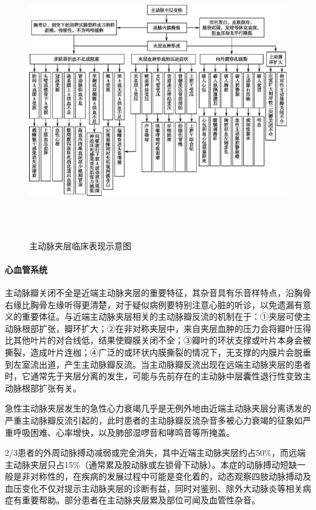 \begin{figure}[!htbp]
 \centering
 \includegraphics[width=6.32292in,height=4.6875in]{./images/Image00485.jpg}
 \captionsetup{justification=centering}
 \caption{主动脉夹层临床表现示意图}
 \label{fig109-2}
  \end{figure} 

\paragraph{心血管系统}

主动脉瓣关闭不全是近端主动脉夹层的重要特征，其杂音具有乐音样特点，沿胸骨右缘比胸骨左缘听得更清楚，对于疑似病例要特别注意心脏的听诊，以免遗漏有意义的重要体征。与近端主动脉夹层相关的主动脉瓣反流的机制在于：①夹层可使主动脉根部扩张，瓣环扩大；②在非对称夹层中，来自夹层血肿的压力会将瓣叶压得比其他叶片的对合线低，结果使瓣膜关闭不全；③瓣叶的环状支撑或叶片本身会被撕裂，造成叶片连枷；④广泛的或环状内膜撕裂的情况下，无支撑的内膜片会脱垂到左室流出道，产生主动脉瓣反流。当主动脉瓣反流出现在远端主动脉夹层的患者时，它通常先于夹层分离的发生，可能与先前存在的主动脉中层囊性退行性变致主动脉根部扩张有关。

急性主动脉夹层发生的急性心力衰竭几乎是无例外地由近端主动脉夹层分离诱发的严重主动脉瓣反流引起的，此时患者的主动脉瓣反流杂音多被心力衰竭的征象如严重呼吸困难、心率增快，以及肺部湿啰音和哮鸣音等所掩盖。

2/3患者的外周动脉搏动减弱或完全消失，其中近端主动脉夹层约占50\%，而远端主动脉夹层只占15\%（通常累及股动脉或左锁骨下动脉）。本症的动脉搏动短缺一般是非对称性的，在疾病的发展过程中可能是变化着的，动态观察四肢动脉搏动及血压变化不仅对提示主动脉夹层的诊断有益，同时对鉴别、除外大动脉炎等相关病症有重要帮助。部分患者在主动脉夹层累及部位可闻及血管性杂音。

